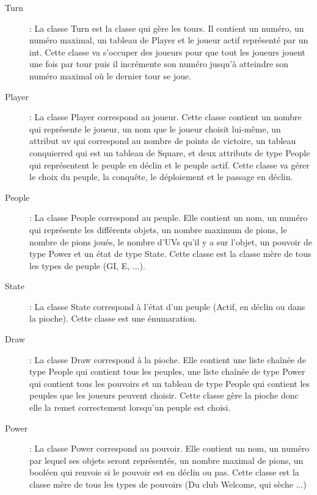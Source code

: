 \documentclass[11pt]{report}
\begin{document}
\begin{description}


\item[Turn] : La classe Turn est la classe qui gère les tours. Il contient un numéro, un numéro maximal, un tableau de Player et le joueur actif représenté par un int. Cette classe va s'occuper des joueurs pour que tout les joueurs jouent une fois par tour puis il incrémente son numéro jusqu'à atteindre son numéro maximal où le dernier tour se joue.

\item[Player] : La classe Player correspond au joueur. Cette classe contient un nombre qui représente le joueur, un nom que le joueur choisit lui-même, un attribut uv qui correspond au nombre de points de victoire, un tableau conquierred qui est un tableau de Square, et deux attributs de type People qui représentent le peuple en déclin et le peuple actif. Cette classe va gérer le choix du peuple, la conquête, le déploiement et le passage en déclin.

\item[People] : La classe People correspond au peuple. Elle contient un nom, un numéro qui représente les différents objets, un nombre maximum de pions, le nombre de pions joués, le nombre d'UVs qu'il y a sur l'objet, un pouvoir de type Power et un état de type State. Cette classe est la classe mère de tous les types de peuple (GI, E, ...).

\item[State] : La classe State correspond à l'état d'un peuple (Actif, en déclin ou dans la pioche). Cette classe est une énumaration.

\item[Draw] : La classe Draw correspond à la pioche. Elle contient une liste chaînée de type People qui contient tous les peuples, une liste chaînée de type Power qui contient tous les pouvoirs et un tableau de type People qui contient les peuples que les joueurs peuvent choisir. Cette classe gère la pioche donc elle la remet correctement lorsqu'un peuple est choisi.

\item[Power] : La classe Power correspond au pouvoir. Elle contient un nom, un numéro par lequel ses objets seront représentés, un nombre maximal de pions, un booléen qui renvoie si le pouvoir est en déclin ou pas. Cette classe est la classe mère de tous les types de pouvoirs (Du club Welcome, qui sèche ...)



\end{description}
\end{document}
